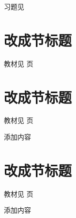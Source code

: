 \begin{flushright}
  \color{zhanqing!80}
   习题见
\end{flushright}

\section{改成节标题}
\begin{flushright}
  \color{zhanqing!80}
  \color{zhanqing!80}
   教材见 页 %
\end{flushright}

\section{改成节标题}
\begin{flushright}
  \color{zhanqing!80}
  \color{zhanqing!80}
   教材见 页 %
\end{flushright}

添加内容

\section{改成节标题}
\begin{flushright}
  \color{zhanqing!80}
  \color{zhanqing!80}
   教材见 页 %
\end{flushright}

添加内容